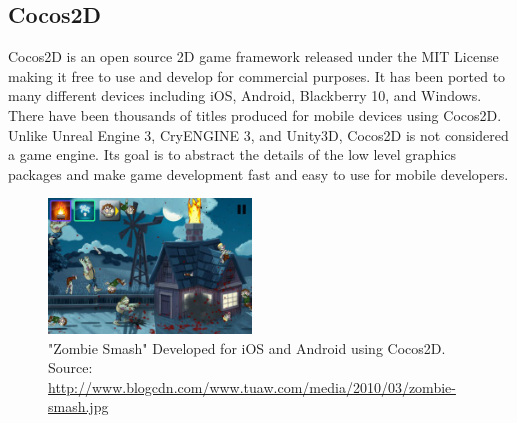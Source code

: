 \subsection{Cocos2D}
Cocos2D is an open source 2D game framework released under the MIT License making it free to use and develop for commercial purposes. It has been ported to many different devices including iOS, Android, Blackberry 10, and Windows. There have been thousands of titles produced for mobile devices using Cocos2D.  Unlike Unreal Engine 3, CryENGINE 3, and Unity3D, Cocos2D is not considered a game engine. Its goal is to abstract the details of the low level graphics packages and make game development fast and easy to use for mobile developers. 
\begin{figure}[!ht]
  \centering \includegraphics[width=0.48\textwidth]{Images/zombie-smash-screenshot.jpg}
	\caption{"Zombie Smash" Developed for iOS and Android using Cocos2D. Source: \url{http://www.blogcdn.com/www.tuaw.com/media/2010/03/zombie-smash.jpg}}
\end{figure}
